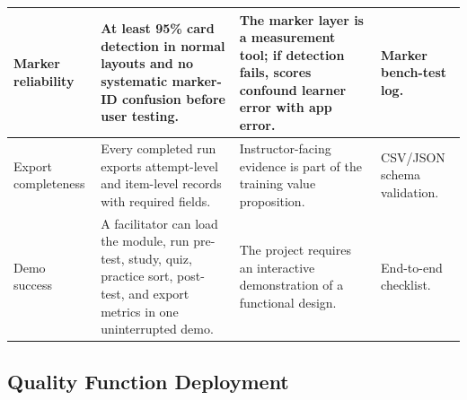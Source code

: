 \documentclass[10pt,a4paper]{article}
\begin{document}
\begin{table}[H]
\begin{tabularx}{\textwidth}{|>{\raggedright\arraybackslash}X|>{\raggedright\arraybackslash}X|>{\raggedright\arraybackslash}X|>{\raggedright\arraybackslash}X|}
\hline
Marker reliability & At least 95\% card detection in normal layouts and no systematic marker-ID confusion before user testing. & The marker layer is a measurement tool; if detection fails, scores confound learner error with app error. & Marker bench-test log. \\
\hline
Export completeness & Every completed run exports attempt-level and item-level records with required fields. & Instructor-facing evidence is part of the training value proposition. & CSV/JSON schema validation. \\
\hline
Demo success & A facilitator can load the module, run pre-test, study, quiz, practice sort, post-test, and export metrics in one uninterrupted demo. & The project requires an interactive demonstration of a functional design. & End-to-end checklist. \\
\hline
\end{tabularx}
\end{table}
\subsection{Quality Function Deployment}
\end{document}
